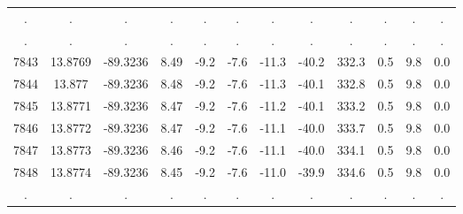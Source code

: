 \begin{table}
\begin{tabular}{cccccccccccc}
             . &                      . &                          . &                      . &                      . &                . &                . &               . &                . &                       . &                 . &              . \\
             . &                      . &                          . &                      . &                      . &                . &                . &               . &                . &                       . &                 . &              . \\
          7843 &                13.8769 &                   -89.3236 &                   8.49 &                   -9.2 &             -7.6 &            -11.3 &           -40.2 &            332.3 &                     0.5 &               9.8 &            0.0 \\
          7844 &                 13.877 &                   -89.3236 &                   8.48 &                   -9.2 &             -7.6 &            -11.3 &           -40.1 &            332.8 &                     0.5 &               9.8 &            0.0 \\
          7845 &                13.8771 &                   -89.3236 &                   8.47 &                   -9.2 &             -7.6 &            -11.2 &           -40.1 &            333.2 &                     0.5 &               9.8 &            0.0 \\
          7846 &                13.8772 &                   -89.3236 &                   8.47 &                   -9.2 &             -7.6 &            -11.1 &           -40.0 &            333.7 &                     0.5 &               9.8 &            0.0 \\
          7847 &                13.8773 &                   -89.3236 &                   8.46 &                   -9.2 &             -7.6 &            -11.1 &           -40.0 &            334.1 &                     0.5 &               9.8 &            0.0 \\
          7848 &                13.8774 &                   -89.3236 &                   8.45 &                   -9.2 &             -7.6 &            -11.0 &           -39.9 &            334.6 &                     0.5 &               9.8 &            0.0 \\
             . &                      . &                          . &                      . &                      . &                . &                . &               . &                . &                       . &                 . &              . \\

\end{tabular}
\end{table}
